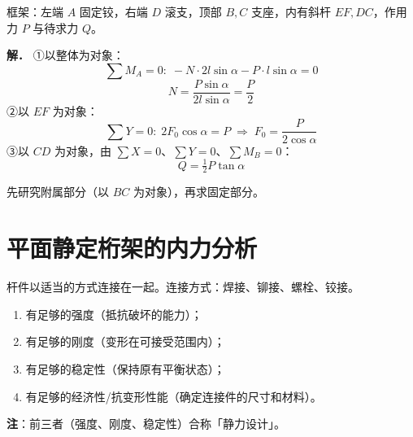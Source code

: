 \begin{example}[求 $Q$ 的大小]
框架：左端 $A$ 固定铰，右端 $D$ 滚支，顶部 $B,C$ 支座，内有斜杆 $EF,DC$，作用力 $P$ 与待求力 $Q$。

\textbf{解．}
①以整体为对象：
\begin{equation}
\sum M_A=0:\;-N\cdot2l\sin\alpha-P\cdot l\sin\alpha=0
\label{eq:2-例-Q-整体}
\end{equation}
\begin{equation}
N=\frac{P\sin\alpha}{2l\sin\alpha}=\frac{P}{2}
\label{eq:2-例-Q-N}
\end{equation}
②以 $EF$ 为对象：
\begin{equation}
\sum Y=0:\;2F_0\cos\alpha=P\;\Rightarrow\;F_0=\frac{P}{2\cos\alpha}
\label{eq:2-例-Q-F0}
\end{equation}
③以 $CD$ 为对象，由 $\sum X=0$、$\sum Y=0$、$\sum M_B=0$：
\begin{equation}
Q=\tfrac12 P\tan\alpha
\label{eq:2-例-Q-Q}
\end{equation}
\end{example}

 先研究附属部分（以 $BC$ 为对象），再求固定部分。

\section{平面静定桁架的内力分析}

 杆件以适当的方式连接在一起。连接方式：焊接、铆接、螺栓、铰接。

\begin{enumerate}
\item 有足够的强度（抵抗破坏的能力）；
\item 有足够的刚度（变形在可接受范围内）；
\item 有足够的稳定性（保持原有平衡状态）；
\item 有足够的经济性/抗变形性能（确定连接件的尺寸和材料）。
\end{enumerate}
\textbf{注}：前三者（强度、刚度、稳定性）合称「静力设计」。

